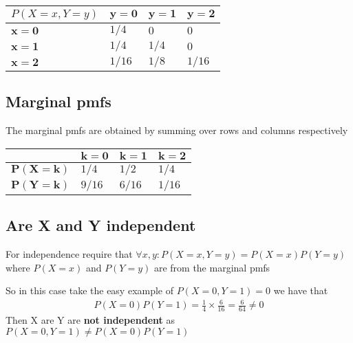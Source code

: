 \documentclass[11pt]{article}
\begin{document}
\begin{tabularx}{\textwidth}{ |X|X|X|X| }
  \hline
  $P(X=x,Y=y)$ & $\bm{y=0}$ & $\bm{y=1}$ & $\bm{y=2}$ \\
  \hline
  $\bm{x=0}$ & $1/4$  & $0$  & $0$  \\
  \hline
  $\bm{x=1}$ & $1/4$  & $1/4$  & $0$  \\
  \hline
  $\bm{x=2}$ & $1/16$  & $1/8$  & $1/16$  \\
  \hline
\end{tabularx}

\subsection{Marginal pmfs}
The marginal pmfs are obtained by summing over rows and columns respectively

\begin{tabularx}{\textwidth}{ |X|X|X|X| }
  \hline
   & $\bm{k=0}$ & $\bm{k=1}$ & $\bm{k=2}$ \\
  \hline
  $\bm{P(X=k)}$ & $1/4$  & $1/2$  & $1/4$  \\
  \hline
  $\bm{P(Y=k)}$ & $9/16$  & $6/16$  & $1/16$  \\
  \hline
\end{tabularx}
\subsection{Are X and Y independent}
For independence require that $\forall x,y : P(X=x,Y=y)=P(X=x)P(Y=y)$ where $P(X=x)$ and $P(Y=y)$ are from the marginal pmfs

So in this case take the easy example of $P(X=0,Y=1) =0$ we have that
\begin{align*}
  P(X=0)P(Y=1)= \frac{1}{4} \times \frac{6}{16} = \frac{6}{64} \neq 0
\end{align*}
Then X are Y are \textbf{not independent} as $P(X=0,Y=1) \neq P(X=0)P(Y=1)$
\end{document}

